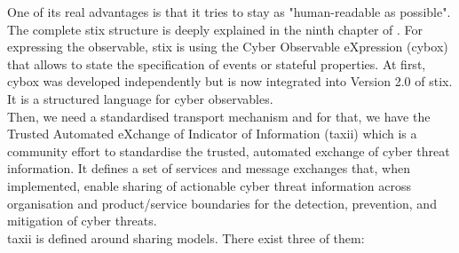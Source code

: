 \documentclass{eplmastersthesis}
\begin{document}
 One of its real advantages is that it tries to stay as "human-readable as possible". The complete \gls{stix} structure is deeply explained in the ninth chapter of \cite{barnum2012standardizing}.
 For expressing the observable, \gls{stix} is using the Cyber Observable eXpression (\gls{cybox})\cite{barnum2012cybox} that allows to state the specification of events or stateful properties. At first, \gls{cybox} was developed independently but is now integrated into Version 2.0 of \gls{stix}. It is a structured language for cyber observables.\\
Then, we need a standardised transport mechanism and for that, we have the Trusted Automated eXchange of Indicator of Information (\gls{taxii}) \cite{connolly2014trusted, TAXIIProjectWeb} which is a community effort to standardise the trusted, automated exchange of cyber threat information. It defines a set of services and message exchanges that, when implemented, enable sharing of actionable cyber threat information across organisation and product/service boundaries for the detection, prevention, and mitigation of cyber threats.\\
\gls{taxii} is defined around sharing models. There exist three of them:
\end{document}
